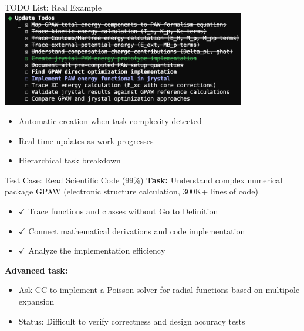 \documentclass[aspectratio=169]{beamer}
\begin{document}
\begin{frame}{TODO List: Real Example}
	\includegraphics[width=0.8\textwidth]{fig/TODO2.jpg}
	
	\begin{itemize}
		\item {\color{highlight}Automatic creation} when task complexity detected
		\item {\color{highlight}Real-time updates} as work progresses
		\item {\color{highlight}Hierarchical} task breakdown
	\end{itemize}
\end{frame}

\begin{frame}[fragile]{Test Case: Read Scientific Code (99\%)}
	\textbf{Task:} Understand complex numerical package GPAW (electronic structure calculation, 300K+ lines of code)
	
		\begin{itemize}
			\item $\checkmark$ Trace functions and classes without Go to Definition
			\item $\checkmark$ Connect mathematical derivations and code implementation
			\item $\checkmark$ Analyze the implementation efficiency
		\end{itemize}

	\textbf{Advanced task:}
	\begin{itemize}
		\item Ask CC to implement a Poisson solver for radial functions based on multipole expansion
		\item Status: Difficult to verify correctness and design accuracy tests
	\end{itemize}
\end{frame}
\end{document}
